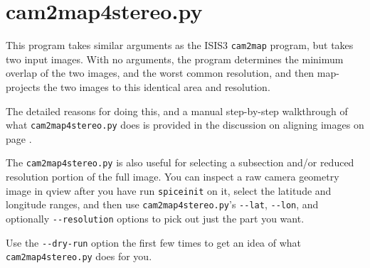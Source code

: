 \section{cam2map4stereo.py}
\label{cam2map4stereo}

This program takes similar arguments as the ISIS3 \texttt{cam2map} program,
but takes two input images.  With no arguments, the program determines
the minimum overlap of the two images, and the worst common resolution,
and then map-projects the two images to this identical area and resolution.

The detailed reasons for doing this, and a manual step-by-step walkthrough of
what \texttt{cam2map4stereo.py} does is provided in the discussion on aligning images on page \pageref{sec:AligningImages}.

The \texttt{cam2map4stereo.py} is also useful for selecting a subsection and/or reduced resolution portion of the full image.  You can inspect a raw camera geometry image in qview after you have run \texttt{spiceinit} on it, select the latitude and longitude ranges, and then use \texttt{cam2map4stereo.py}'s \texttt{-\/-lat}, \texttt{-\/-lon}, and optionally \texttt{-\/-resolution} options to pick out just the part you want.

Use the \texttt{-\/-dry-run} option the first few times to get an idea of what \texttt{cam2map4stereo.py} does for you.

